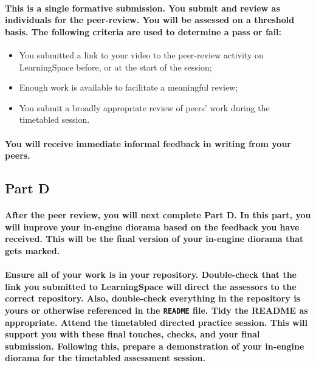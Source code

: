 \documentclass{../../fal_assignment}
\begin{document}

\paragraph{}

\paragraph{This is a \textbf{single formative submission}. You submit and review as \textbf{individuals} for the peer-review. You will be assessed on a \textbf{threshold} basis. The following criteria are used to determine a pass or fail:}

\begin{itemize}
	\item You submitted a link to your video to the peer-review activity on LearningSpace before, or at the start of the session;
	\item Enough work is available to facilitate a meaningful review;
	\item You submit a broadly appropriate review of peers' work during the timetabled session.
\end{itemize}

\paragraph{You will receive immediate \textbf{informal feedback} in writing from your \textbf{peers}.}

\subsection*{Part D}

\paragraph{After the peer review, you will next complete Part D. In this part, you will improve your in-engine diorama based on the feedback you have received. This will be the final version of your in-engine diorama that gets marked.}

\paragraph{Ensure all of your work is in your repository. Double-check that the link you submitted to LearningSpace will direct the assessors to the correct repository. Also, double-check everything in the repository is yours or otherwise referenced in the \texttt{README} file. Tidy the README as appropriate. Attend the timetabled directed practice session. This will support you with these final touches, checks, and your final submission. Following this, prepare a demonstration of your in-engine diorama for the timetabled assessment session.}
\end{document}
